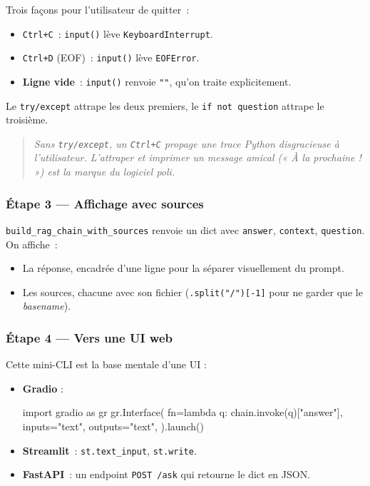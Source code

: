 \documentclass[11pt,a4paper]{article}
\begin{document}
Trois façons pour l'utilisateur de quitter~:

\begin{itemize}[leftmargin=*]
  \item \texttt{Ctrl+C}~: \texttt{input()} lève \texttt{KeyboardInterrupt}.
  \item \texttt{Ctrl+D} (EOF)~: \texttt{input()} lève \texttt{EOFError}.
  \item \textbf{Ligne vide}~: \texttt{input()} renvoie \texttt{""}, qu'on
        traite explicitement.
\end{itemize}

Le \texttt{try/except} attrape les deux premiers, le \texttt{if not
question} attrape le troisième.

\begin{quote}\itshape
Sans \texttt{try/except}, un \texttt{Ctrl+C} propage une trace Python
disgracieuse à l'utilisateur. L'attraper et imprimer un message
amical (« À la prochaine ! ») est la marque du logiciel poli.
\end{quote}

\subsubsection*{Étape 3 — Affichage avec sources}

\texttt{build\_rag\_chain\_with\_sources} renvoie un dict avec
\texttt{answer}, \texttt{context}, \texttt{question}. On affiche~:
\begin{itemize}[leftmargin=*]
  \item La réponse, encadrée d'une ligne pour la séparer visuellement
        du prompt.
  \item Les sources, chacune avec son fichier (\texttt{.split("/")[-1]}
        pour ne garder que le \emph{basename}).
\end{itemize}

\subsubsection*{Étape 4 — Vers une UI web}

Cette mini-CLI est la base mentale d'une UI :
\begin{itemize}[leftmargin=*]
  \item \textbf{Gradio} :
\begin{pythoncode}
import gradio as gr
gr.Interface(
    fn=lambda q: chain.invoke(q)["answer"],
    inputs="text", outputs="text",
).launch()
\end{pythoncode}
  \item \textbf{Streamlit}~: \texttt{st.text\_input}, \texttt{st.write}.
  \item \textbf{FastAPI}~: un endpoint \texttt{POST /ask} qui retourne
        le dict en JSON.
\end{itemize}
\end{document}
